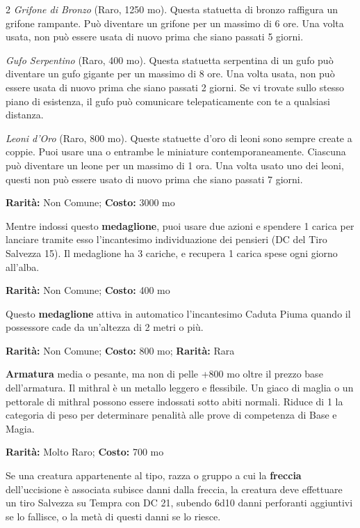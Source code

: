 \begin{multicols}{2}
\emph{Grifone di Bronzo} (Raro, 1250 mo). Questa statuetta di bronzo raffigura un grifone rampante. Può diventare un grifone per un massimo di 6 ore. Una volta usata, non può essere usata di nuovo prima che siano passati 5 giorni.

\emph{Gufo Serpentino} (Raro, 400 mo). Questa statuetta serpentina di un gufo può diventare un gufo gigante per un massimo di 8 ore. Una volta usata, non può essere usata di nuovo prima che siano passati 2 giorni. Se vi trovate sullo stesso piano di esistenza, il gufo può comunicare telepaticamente con te a qualsiasi distanza.

\emph{Leoni d'Oro} (Raro, 800 mo). Queste statuette d'oro di leoni sono sempre create a coppie. Puoi usare una o entrambe le miniature contemporaneamente. Ciascuna può diventare un leone per un massimo di 1 ora. Una volta usato uno dei leoni, questi non può essere usato di nuovo prima che siano passati 7 giorni.


\textbf{Rarità:} Non Comune; \textbf{Costo:} 3000 mo

Mentre indossi questo \textbf{medaglione}, puoi usare due azioni e spendere 1 carica per lanciare tramite esso l'incantesimo individuazione dei pensieri (DC del Tiro Salvezza 15). Il medaglione ha 3 cariche, e recupera 1 carica spese ogni giorno all'alba.


\textbf{Rarità:} Non Comune; \textbf{Costo:} 400 mo

Questo \textbf{medaglione} attiva in automatico l'incantesimo Caduta Piuma quando il possessore cade da un'altezza di 2 metri o più.


\textbf{Rarità:} Non Comune; \textbf{Costo:} 800 mo; \textbf{Rarità:} Rara

\textbf{Armatura} media o pesante, ma non di pelle +800 mo oltre il prezzo base dell'armatura. Il mithral è un metallo leggero e flessibile. Un giaco di maglia o un pettorale di mithral possono essere indossati sotto abiti normali. Riduce di 1 la categoria di peso per determinare penalità alle prove di competenza di Base e Magia.


\textbf{Rarità:} Molto Raro; \textbf{Costo:} 700 mo

Se una creatura appartenente al tipo, razza o gruppo a cui la \textbf{freccia} dell'uccisione è associata subisce danni dalla freccia, la creatura deve effettuare un tiro Salvezza su Tempra con DC 21, subendo 6d10 danni perforanti aggiuntivi se lo fallisce, o la metà di questi danni se lo riesce.


\end{multicols}
